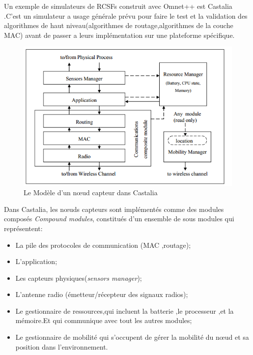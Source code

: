 Un exemple de simulateurs de RCSFs construit avec Omnet++ est Castalia .C'est un simulateur a usage générale prévu pour faire le test et la validation des algorithmes de haut niveau(algorithmes de routage,algorithmes de la couche MAC) avant de passer a leurs implémentation sur une plateforme spécifique.
\begin{figure}[!h]
\includegraphics[scale=0.8]{castaliaModel}
\caption{\label{castaliaModel}Le Modèle d'un nœud capteur dans Castalia}
\end{figure}
Dans Castalia, les nœuds capteurs sont implémentés comme des modules composés \emph{Compound modules}, constitués d'un ensemble de sous modules qui représentent:
\begin{itemize}
\item La pile des protocoles de communication (MAC ,routage);%
\item L'application;
\item Les capteurs physiques(\emph{sensors manager});
\item L'antenne radio (émetteur/récepteur des signaux radios);
\item Le gestionnaire de ressources,qui incluent la batterie ,le processeur ,et la mémoire.Et qui communique avec tout les autres modules;
\item Le gestionnaire de mobilité qui s'occupent de gérer la mobilité du nœud et sa position dans l'environnement.
\end{itemize}


